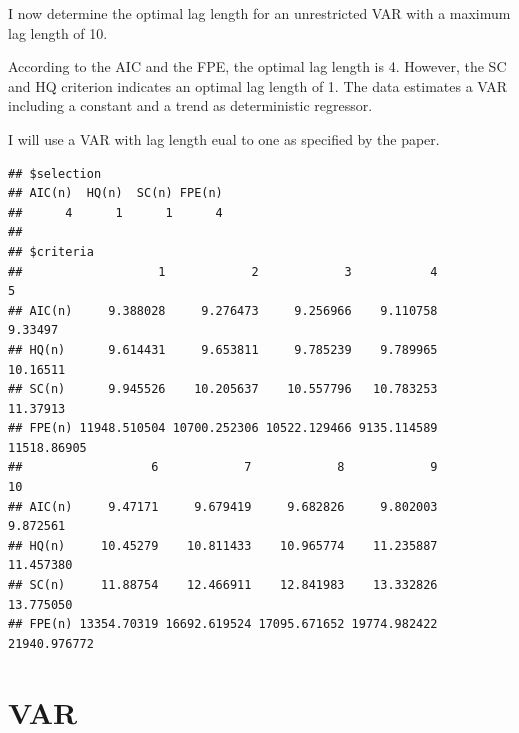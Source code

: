 \documentclass[11pt,preprint, authoryear]{elsarticle}
\numberwithin{equation}{section}
\numberwithin{figure}{section}
\numberwithin{table}{section}
\begin{document}
I now determine the optimal lag length for an unrestricted VAR with a
maximum lag length of 10.

According to the AIC and the FPE, the optimal lag length is 4. However,
the SC and HQ criterion indicates an optimal lag length of 1. The data
estimates a VAR including a constant and a trend as deterministic
regressor.

I will use a VAR with lag length eual to one as specified by the paper.

\begin{verbatim}
## $selection
## AIC(n)  HQ(n)  SC(n) FPE(n) 
##      4      1      1      4 
## 
## $criteria
##                   1            2            3           4           5
## AIC(n)     9.388028     9.276473     9.256966    9.110758     9.33497
## HQ(n)      9.614431     9.653811     9.785239    9.789965    10.16511
## SC(n)      9.945526    10.205637    10.557796   10.783253    11.37913
## FPE(n) 11948.510504 10700.252306 10522.129466 9135.114589 11518.86905
##                  6            7            8            9           10
## AIC(n)     9.47171     9.679419     9.682826     9.802003     9.872561
## HQ(n)     10.45279    10.811433    10.965774    11.235887    11.457380
## SC(n)     11.88754    12.466911    12.841983    13.332826    13.775050
## FPE(n) 13354.70319 16692.619524 17095.671652 19774.982422 21940.976772
\end{verbatim}

\hypertarget{var}{%
\section{VAR}\label{var}}
\end{document}
